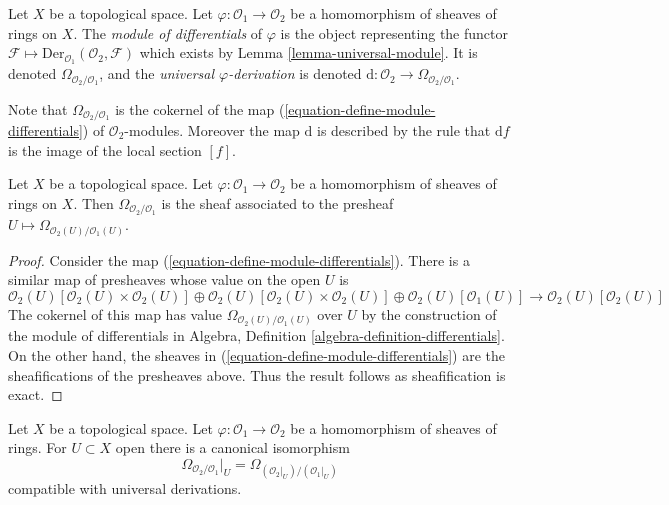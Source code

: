 \begin{definition}
\label{definition-module-differentials}
Let $X$ be a topological space. Let $\varphi : \mathcal{O}_1 \to \mathcal{O}_2$
be a homomorphism of sheaves of rings on $X$. The {\it module of differentials}
of $\varphi$ is the object representing the functor
$\mathcal{F} \mapsto \text{Der}_{\mathcal{O}_1}(\mathcal{O}_2, \mathcal{F})$
which exists by Lemma \ref{lemma-universal-module}.
It is denoted $\Omega_{\mathcal{O}_2/\mathcal{O}_1}$, and the {\it universal
$\varphi$-derivation} is denoted
$\text{d} : \mathcal{O}_2 \to \Omega_{\mathcal{O}_2/\mathcal{O}_1}$.
\end{definition}

\noindent
Note that $\Omega_{\mathcal{O}_2/\mathcal{O}_1}$ is the cokernel of
the map (\ref{equation-define-module-differentials}) of
$\mathcal{O}_2$-modules. Moreover the map $\text{d}$ is described
by the rule that $\text{d}f$ is the image of the local section $[f]$.

\begin{lemma}
\label{lemma-differentials-sheafify}
Let $X$ be a topological space. Let $\varphi : \mathcal{O}_1 \to \mathcal{O}_2$
be a homomorphism of sheaves of rings on $X$. Then
$\Omega_{\mathcal{O}_2/\mathcal{O}_1}$ is the sheaf associated to the
presheaf $U \mapsto \Omega_{\mathcal{O}_2(U)/\mathcal{O}_1(U)}$.
\end{lemma}

\begin{proof}
Consider the map (\ref{equation-define-module-differentials}). There is
a similar map of presheaves whose value on the open $U$ is
$$
\mathcal{O}_2(U)[\mathcal{O}_2(U) \times \mathcal{O}_2(U)] \oplus
\mathcal{O}_2(U)[\mathcal{O}_2(U) \times \mathcal{O}_2(U)] \oplus
\mathcal{O}_2(U)[\mathcal{O}_1(U)]
\longrightarrow
\mathcal{O}_2(U)[\mathcal{O}_2(U)]
$$
The cokernel of this map has value $\Omega_{\mathcal{O}_2(U)/\mathcal{O}_1(U)}$
over $U$ by the construction of the module of differentials in 
Algebra, Definition \ref{algebra-definition-differentials}.
On the other hand, the sheaves in (\ref{equation-define-module-differentials})
are the sheafifications of the presheaves above. Thus the result follows
as sheafification is exact.
\end{proof}

\begin{lemma}
\label{lemma-localize-differentials}
Let $X$ be a topological space. Let $\varphi : \mathcal{O}_1 \to \mathcal{O}_2$
be a homomorphism of sheaves of rings. For $U \subset X$ open
there is a canonical isomorphism
$$
\Omega_{\mathcal{O}_2/\mathcal{O}_1}|_U =
\Omega_{(\mathcal{O}_2|_U)/(\mathcal{O}_1|_U)}
$$
compatible with universal derivations.
\end{lemma}

